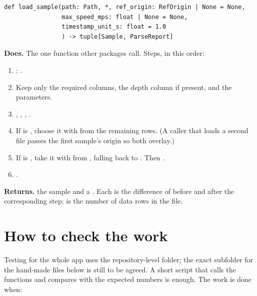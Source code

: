 \documentclass{article}
\newenvironment{card}{\par\smallskip\noindent\begin{minipage}{\linewidth}}{\end{minipage}\par}
\begin{document}
\begin{card}
\begin{lstlisting}[style=sig]
def load_sample(path: Path, *, ref_origin: RefOrigin | None = None,
                max_speed_mps: float | None = None,
                timestamp_unit_s: float = 1.0
                ) -> tuple[Sample, ParseReport]
\end{lstlisting}
\textbf{Does.} The one function other packages call. Steps, in this order:
\begin{enumerate}
\item {}; .
\item Keep only the required columns, the depth column if present, and the
      parameters.
\item {}, , ,
      .
\item If  is , choose it with
       from the remaining rows. (A caller that
      loads a second file passes the first sample's origin so both overlay.)
\item If  is , take it with 
      from , falling back to
      . Then .
\item {}.
\end{enumerate}
\textbf{Returns.} the sample and a . Each 
is the difference of  before and after the corresponding
step;  is the number of data rows in the file.
\end{card}

\section{How to check the work}

Testing for the whole app uses the repository-level  folder; the
exact subfolder for the hand-made files below is still to be agreed. A short
script that calls the functions and compares with the expected numbers is
enough. The work is done when:
\end{document}
